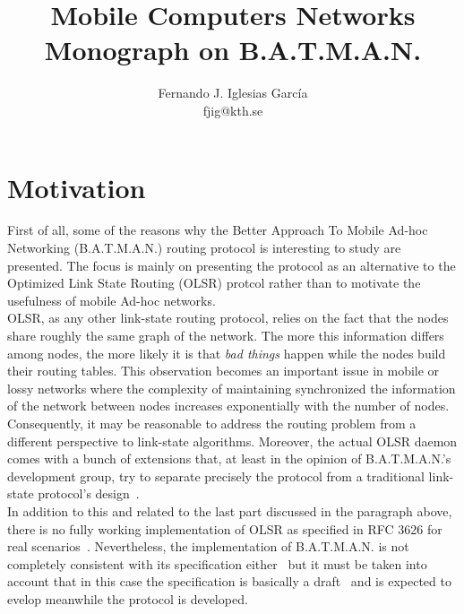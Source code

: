 \documentclass[a4paper]{article}
\begin{document}
\newcommand{\batman}{B.A.T.M.A.N.}

\title{Mobile Computers Networks \\
Monograph on \batman}
\author{Fernando J. Iglesias Garc\'{i}a \\ fjig@kth.se}

\maketitle


\section{Motivation}

First of all, some of the reasons why the Better Approach To Mobile
Ad-hoc Networking (\batman) routing protocol is interesting to study are
presented. The focus is mainly on presenting the protocol as an alternative
to the Optimized Link State Routing (OLSR) protcol rather than to motivate
the usefulness of mobile Ad-hoc networks. \\

\vspace{2mm}
OLSR, as any other link-state routing protocol, relies on the fact that the
nodes share roughly the same graph of the network. The more this information
differs among nodes, the more likely it is that \emph{bad things}
happen while the nodes build their routing tables. This observation becomes an
important issue in mobile or lossy networks where the complexity of maintaining
synchronized the information of the network between nodes increases
exponentially with the number of nodes. Consequently, it may be reasonable to
address the routing problem from a different perspective to link-state
algorithms. Moreover, the actual OLSR daemon comes with a bunch of extensions
that, at least in the opinion of \batman's development group, try to separate
precisely the protocol from a traditional link-state protocol's 
design~\cite{whyBatman}. \\

\vspace{2mm}
In addition to this and related to the last part discussed in the paragraph
above, there is no fully working implementation of OLSR as specified in RFC 3626
for real scenarios~\cite{whyBatman}. Nevertheless, the implementation of \batman
is not completely consistent with its specification
either~\cite{mailBatmanComments} but it must be taken into account that in this
case the specification is basically a draft~\cite{batmanRFC} and is expected 
to evelop meanwhile the protocol is developed.
\end{document}
